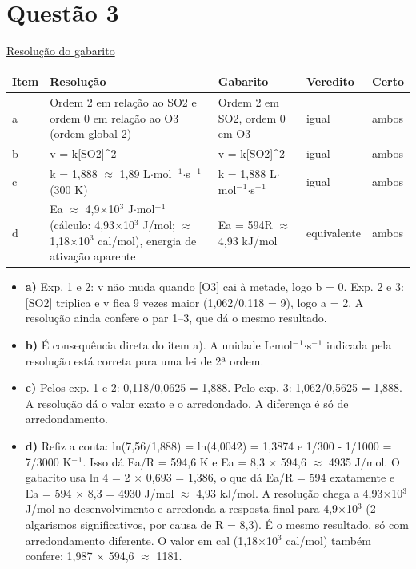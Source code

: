 \documentclass{article}%
\begin{document}
\section*{Questão 3}%
\href{https://poliedroresolve.sistemapoliedro.com.br/vestibulares/ime/2027/ime-2-fase-dia-3-28-10-2026-2-fase-dia-3/dissertativa-3-quimica-2-fase-dia-3-ime-2027}{Resolução do gabarito}\par\smallskip%
\begin{longtable}{@{}p{} p{} p{} p{} p{}@{}}\toprule Item & Resolução & Gabarito & Veredito & Certo \\ \midrule
a & Ordem 2 em relação ao SO2 e ordem 0 em relação ao O3 (ordem global 2) & Ordem 2 em SO2, ordem 0 em O3 & igual & ambos \\
b & v = k{[}SO2{]}\^{}2 & v = k{[}SO2{]}\^{}2 & igual & ambos \\
c & k = 1,888 $\approx$ 1,89 L$\cdot$mol$^{-}$$^{1}$$\cdot$s$^{-}$$^{1}$ (300 K) & k = 1,888 L$\cdot$mol$^{-}$$^{1}$$\cdot$s$^{-}$$^{1}$ & igual & ambos \\
d & Ea $\approx$ 4,9$\times$10$^3$ J$\cdot$mol$^{-}$$^{1}$ (cálculo: 4,93$\times$10$^3$ J/mol; $\approx$1,18$\times$10$^3$ cal/mol), energia de ativação aparente & Ea = 594R $\approx$ 4,93 kJ/mol & equivalente & ambos \\
\bottomrule\end{longtable}%
\begin{itemize}%
\item%
\textbf{a)} Exp. 1 e 2: v não muda quando {[}O3{]} cai à metade, logo b = 0. Exp. 2 e 3: {[}SO2{]} triplica e v fica 9 vezes maior (1,062/0,118 = 9), logo a = 2. A resolução ainda confere o par 1--3, que dá o mesmo resultado.%
\item%
\textbf{b)} É consequência direta do item a). A unidade L$\cdot$mol$^{-}$$^{1}$$\cdot$s$^{-}$$^{1}$ indicada pela resolução está correta para uma lei de 2ª ordem.%
\item%
\textbf{c)} Pelos exp. 1 e 2: 0,118/0,0625 = 1,888. Pelo exp. 3: 1,062/0,5625 = 1,888. A resolução dá o valor exato e o arredondado. A diferença é só de arredondamento.%
\item%
\textbf{d)} Refiz a conta: ln(7,56/1,888) = ln(4,0042) = 1,3874 e 1/300 - 1/1000 = 7/3000 K$^{-}$$^{1}$. Isso dá Ea/R = 594,6 K e Ea = 8,3 $\times$ 594,6 $\approx$ 4935 J/mol. O gabarito usa ln 4 = 2 $\times$ 0,693 = 1,386, o que dá Ea/R = 594 exatamente e Ea = 594 $\times$ 8,3 = 4930 J/mol $\approx$ 4,93 kJ/mol. A resolução chega a 4,93$\times$10$^3$ J/mol no desenvolvimento e arredonda a resposta final para 4,9$\times$10$^3$ (2 algarismos significativos, por causa de R = 8,3). É o mesmo resultado, só com arredondamento diferente. O valor em cal (1,18$\times$10$^3$ cal/mol) também confere: 1,987 $\times$ 594,6 $\approx$ 1181.%
\end{itemize}%
\end{document}
